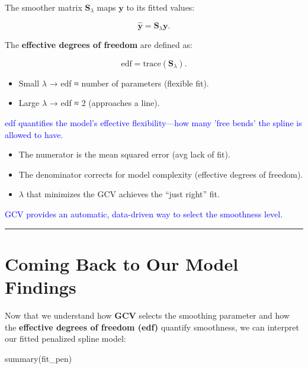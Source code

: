 \documentclass[
  letterpaper,
  DIV=11,
  numbers=noendperiod]{scrreprt}
\newenvironment{Shaded}{\begin{snugshade}}{\end{snugshade}}
\newcommand{\FunctionTok}[1]{\textcolor[rgb]{0.28,0.35,0.67}{#1}}
\newcommand{\NormalTok}[1]{\textcolor[rgb]{0.00,0.23,0.31}{#1}}
\providecommand{\tightlist}{%
  \setlength{\itemsep}{0pt}\setlength{\parskip}{0pt}}\usepackage{longtable,booktabs,array}
\begin{document}
The smoother matrix \(\mathbf{S}_\lambda\) maps \(\mathbf{y}\) to its
fitted values:

\[
\hat{\mathbf{y}} = \mathbf{S}_\lambda \mathbf{y}.
\]

The \textbf{effective degrees of freedom} are defined as:

\[
\text{edf} = \text{trace}(\mathbf{S}_\lambda).
\]

\begin{itemize}
\tightlist
\item
  Small \(\lambda\) → edf ≈ number of parameters (flexible fit).\\
\item
  Large \(\lambda\) → edf ≈ 2 (approaches a line).
\end{itemize}

\textcolor{blue}{edf quantifies the model’s effective flexibility—how many 'free bends' the spline is allowed to have.}

\begin{itemize}
\tightlist
\item
  The numerator is the mean squared error (avg lack of fit).
\item
  The denominator corrects for model complexity (effective degrees of
  freedom).
\item
  \(\lambda\) that minimizes the GCV achieves the ``just right'' fit.
\end{itemize}

\textcolor{blue}{GCV provides an automatic, data-driven way to select the smoothness level.}

\begin{center}\rule{0.5\linewidth}{0.5pt}\end{center}

\hypertarget{coming-back-to-our-model-findings}{%
\section*{Coming Back to Our Model
Findings}\label{coming-back-to-our-model-findings}}


Now that we understand how \textbf{GCV} selects the smoothing parameter
and how the \textbf{effective degrees of freedom (edf)} quantify
smoothness, we can interpret our fitted penalized spline model:

\begin{Shaded}
\begin{Highlighting}[]
\FunctionTok{summary}\NormalTok{(fit\_pen)}
\end{Highlighting}
\end{Shaded}
\end{document}
